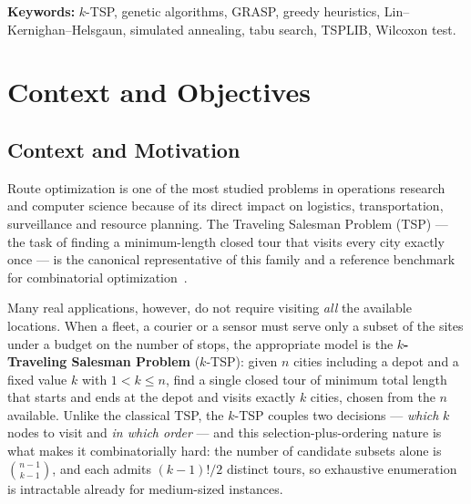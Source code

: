 \documentclass[12pt,a4paper,oneside]{report}
\begin{document}
\vspace{0.3cm}
\noindent\textbf{Keywords:} $k$-TSP, genetic algorithms, GRASP, greedy heuristics,
Lin--Kernighan--Helsgaun, simulated annealing, tabu search, TSPLIB, Wilcoxon test.

\clearpage

\tableofcontents
\clearpage

\listoffigures
{}
\clearpage

\listoftables
{}
\clearpage

\chapter{Context and Objectives}

\section{Context and Motivation}
Route optimization is one of the most studied problems in operations research
and computer science because of its direct impact on logistics, transportation,
surveillance and resource planning. The Traveling Salesman Problem (TSP) --- the
task of finding a minimum-length closed tour that visits every city exactly once
--- is the canonical representative of this family and a reference benchmark for
combinatorial optimization~\cite{lawler1985,applegate2006concorde}.

Many real applications, however, do not require visiting \emph{all} the available
locations. When a fleet, a courier or a sensor must serve only a subset of the
sites under a budget on the number of stops, the appropriate model is the
\textbf{$k$-Traveling Salesman Problem} ($k$-TSP): given $n$ cities including a
depot and a fixed value $k$ with $1<k\le n$, find a single closed tour of minimum
total length that starts and ends at the depot and visits exactly $k$ cities,
chosen from the $n$ available. Unlike the classical TSP, the $k$-TSP couples two
decisions --- \emph{which} $k$ nodes to visit and \emph{in which order} --- and
this selection-plus-ordering nature is what makes it combinatorially hard: the
number of candidate subsets alone is $\binom{n-1}{k-1}$, and each admits
$(k-1)!/2$ distinct tours, so exhaustive enumeration is intractable already for
medium-sized instances.
\end{document}
